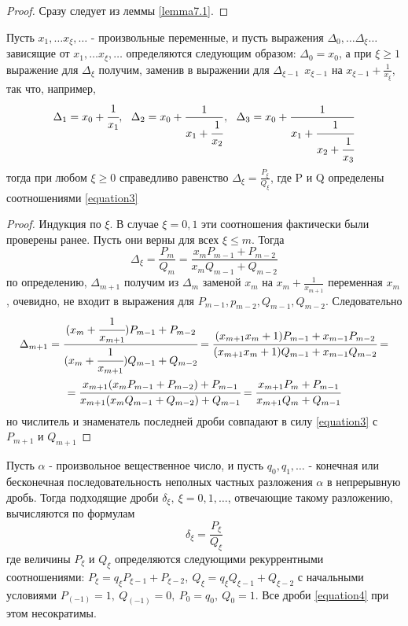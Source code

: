     \begin{proof}
        Сразу следует из леммы \ref{lemma7.1}.
    \end{proof} 
    \begin{lemma}\label{lemma7.3}
        Пусть $x_1,\dots x_{\xi},\dots$ - произвольные переменные, и пусть выражения $\Delta_0,\dots \Delta_{\xi}\dots$ зависящие от $x_1,\dots x_{\xi},\dots$ определяются следующим образом: $\Delta_0=x_0$, а при $\xi\geq 1$ выражение для $\Delta_{\xi}$ получим, заменив в выражении для $\Delta_{\xi-1}\ \ x_{\xi-1}$ на $x_{\xi-1}+\frac{1}{x_{\xi}}$, так что, например,
        \[\Delta_1=x_0+\cfrac{1}{x_1},\ \ \Delta_2=x_0+\frac{1}{x_1+\cfrac{1}{x_2}},\ \ \Delta_3=x_0+\frac{1}{x_1+\cfrac{1}{x_2+\cfrac{1}{x_3}}}\]
        тогда при любом $\xi\geq 0$ справедливо равенство $\Delta_{\xi}=\frac{P_{\xi}}{Q_{\xi}}$, где P и Q определены соотношениями \eqref{equation3}
    \end{lemma} 
    \begin{proof}
        Индукция по $\xi$. В случае $\xi=0,1$ эти соотношения фактически были проверены ранее. Пусть они верны для всех $\xi\leq m$. Тогда
        \[\Delta_{\xi}=\frac{P_m}{Q_m}=\frac{x_m P_{m-1}+P_{m-2}}{x_m Q_{m-1}+Q_{m-2}}\]
        по определению, $\Delta_{m+1}$ получим из $\Delta_m$ заменой $x_m$ на $x_m+\frac{1}{x_{m+1}}$ переменная $x_m$, очевидно, не входит в выражения для $P_{m-1}, p_{m-2}, Q_{m-1}, Q_{m-2}$. Следовательно
        \begin{multline*}
        \Delta_{m+1}=\cfrac{(x_m+\cfrac{1}{x_{m+1}})P_{m-1}+P_{m-2}}{(x_m+\cfrac{1}{x_{m+1}})Q_{m-1}+Q_{m-2}}=\cfrac{(x_{m+1}x_m+1)P_{m-1}+x_{m-1}P_{m-2}}{(x_{m+1}x_m+1)Q_{m-1}+x_{m-1}Q_{m-2}}=\\=\cfrac{x_{m+1}(x_m P_{m-1}+P_{m-2})+P_{m-1}}{x_{m+1}(x_m Q_{m-1}+Q_{m-2})+Q_{m-1}}=\cfrac{x_{m+1}P_m+P_{m-1}}{x_{m+1}Q_m+Q_{m-1}}
        \end{multline*}
        но числитель и знаменатель последней дроби совпадают в силу \eqref{equation3} с $P_{m+1}$ и $Q_{m+1}$
    \end{proof} 
    \begin{theorem} \label{th7.2}
        Пусть $\alpha$ - произвольное вещественное число, и пусть $q_0, q_1, \dots$ - конечная или бесконечная последовательность неполных частных разложения $\alpha$ в непрерывную дробь. Тогда подходящие дроби $\delta_{\xi}, \ \xi=0,1,\dots$, отвечающие такому разложению, вычисляются по формулам
        \begin{equation} \label{equation4}
            \delta_{\xi}=\frac{P_{\xi}}{Q_{\xi}}
        \end{equation}
        где величины $P_{\xi}$ и $Q_{\xi}$ определяются следующими рекуррентными соотношениями: $P_{\xi}=q_{\xi}P_{\xi-1}+P_{\xi-2}, \ Q_{\xi}=q_{\xi}Q_{\xi-1}+Q_{\xi-2}$ с начальными условиями $P_{(-1)}=1,\ Q_{(-1)}=0,\ P_0=q_0,\ Q_0=1$. Все дроби \eqref{equation4} при этом несократимы.
    \end{theorem} 
